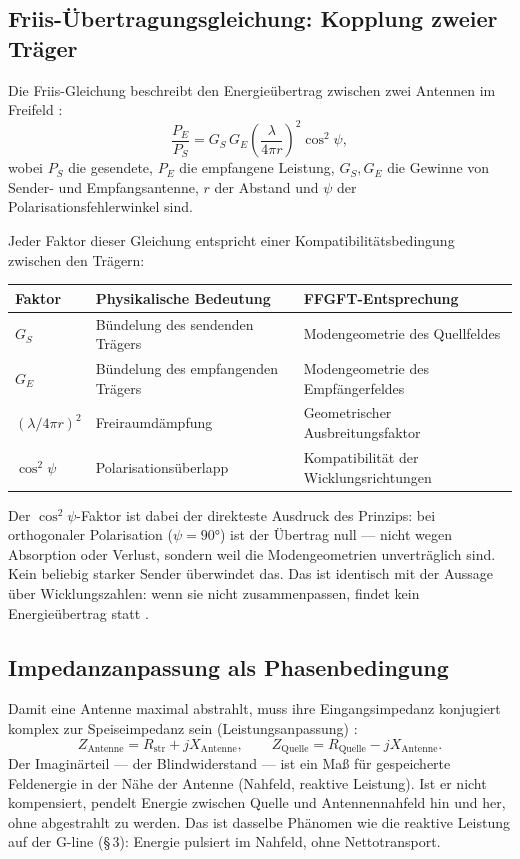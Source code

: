 \subsection*{Friis-Übertragungsgleichung: Kopplung zweier Träger}

Die Friis-Gleichung beschreibt den Energieübertrag zwischen zwei Antennen
im Freifeld \cite{Friis1946,Balanis2016}:
\[
  \frac{P_E}{P_S} = G_S\,G_E\left(\frac{\lambda}{4\pi r}\right)^2
  \cos^2\psi,
\]
wobei $P_S$ die gesendete, $P_E$ die empfangene Leistung, $G_S, G_E$ die
Gewinne von Sender- und Empfangsantenne, $r$ der Abstand und $\psi$ der
Polarisationsfehlerwinkel sind.

Jeder Faktor dieser Gleichung entspricht einer Kompatibilitätsbedingung
zwischen den Trägern:

\begin{center}
\begin{tabular}{@{}lll@{}}
\toprule
\textbf{Faktor} & \textbf{Physikalische Bedeutung} & \textbf{FFGFT-Entsprechung} \\
\midrule
$G_S$ & Bündelung des sendenden Trägers & Modengeometrie des Quellfeldes \\
$G_E$ & Bündelung des empfangenden Trägers & Modengeometrie des Empfängerfeldes \\
$(\lambda/4\pi r)^2$ & Freiraumdämpfung & Geometrischer Ausbreitungsfaktor \\
$\cos^2\psi$ & Polarisationsüberlapp & Kompatibilität der Wicklungsrichtungen \\
\bottomrule
\end{tabular}
\end{center}

Der $\cos^2\psi$-Faktor ist dabei der direkteste Ausdruck des Prinzips:
bei orthogonaler Polarisation ($\psi=90°$) ist der Übertrag null ---
nicht wegen Absorption oder Verlust, sondern weil die Modengeometrien
unverträglich sind. Kein beliebig starker Sender überwindet das.
Das ist identisch mit der Aussage über Wicklungszahlen: wenn sie nicht
zusammenpassen, findet kein Energieübertrag statt \SM.

\subsection*{Impedanzanpassung als Phasenbedingung}

Damit eine Antenne maximal abstrahlt, muss ihre Eingangsimpedanz
konjugiert komplex zur Speiseimpedanz sein (Leistungsanpassung) \EM:
\[
  Z_\mathrm{Antenne} = R_\mathrm{str} + jX_\mathrm{Antenne}, \qquad
  Z_\mathrm{Quelle} = R_\mathrm{Quelle} - jX_\mathrm{Antenne}.
\]
Der Imaginärteil --- der Blindwiderstand --- ist ein Maß für gespeicherte
Feldenergie in der Nähe der Antenne (Nahfeld, reaktive Leistung). Ist er
nicht kompensiert, pendelt Energie zwischen Quelle und Antennennahfeld hin
und her, ohne abgestrahlt zu werden. Das ist dasselbe Phänomen wie die
reaktive Leistung auf der G-line (§\,3): Energie pulsiert im Nahfeld,
ohne Nettotransport.

